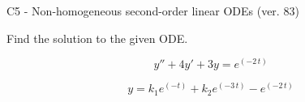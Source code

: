 \begin{exercise}
  \begin{exerciseTitle}C5 - Non-homogeneous second-order linear ODEs (ver. 83)\end{exerciseTitle}
  \begin{exerciseStatement}
    
Find the solution to the given ODE.

    
\[y''+4y'+3y = e^{\left(-2 \, t\right)}\]

  \end{exerciseStatement}
  \begin{exerciseAnswer}
    
\[y= k_{1} e^{\left(-t\right)} + k_{2} e^{\left(-3 \, t\right)} - e^{\left(-2 \, t\right)}\]

  \end{exerciseAnswer}
\end{exercise}
